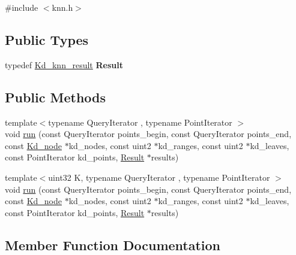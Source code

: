 {\ttfamily \#include $<$knn.\+h$>$}

\subsection*{Public Types}
\begin{DoxyCompactItemize}
\item 
\mbox{\label{structcugar_1_1cuda_1_1_kd__knn_a0786ce849457dbcd48ea5d5713134fb8}} 
typedef \hyperlink{structcugar_1_1cuda_1_1_kd__knn__result}{Kd\+\_\+knn\+\_\+result} {\bfseries Result}
\end{DoxyCompactItemize}
\subsection*{Public Methods}
\begin{DoxyCompactItemize}
\item 
{\footnotesize template$<$typename Query\+Iterator , typename Point\+Iterator $>$ }\\void \hyperlink{structcugar_1_1cuda_1_1_kd__knn_a7d04646c1a646cd30b49ba6faf4b06d2}{run} (const Query\+Iterator points\+\_\+begin, const Query\+Iterator points\+\_\+end, const \hyperlink{structcugar_1_1_kd__node}{Kd\+\_\+node} $\ast$kd\+\_\+nodes, const uint2 $\ast$kd\+\_\+ranges, const uint2 $\ast$kd\+\_\+leaves, const Point\+Iterator kd\+\_\+points, \hyperlink{structcugar_1_1cuda_1_1_kd__knn__result}{Result} $\ast$results)
\item 
{\footnotesize template$<$uint32 K, typename Query\+Iterator , typename Point\+Iterator $>$ }\\void \hyperlink{structcugar_1_1cuda_1_1_kd__knn_aa9040a5e6f8cf2ba2c5c50af64a066f8}{run} (const Query\+Iterator points\+\_\+begin, const Query\+Iterator points\+\_\+end, const \hyperlink{structcugar_1_1_kd__node}{Kd\+\_\+node} $\ast$kd\+\_\+nodes, const uint2 $\ast$kd\+\_\+ranges, const uint2 $\ast$kd\+\_\+leaves, const Point\+Iterator kd\+\_\+points, \hyperlink{structcugar_1_1cuda_1_1_kd__knn__result}{Result} $\ast$results)
\end{DoxyCompactItemize}


\subsection{Member Function Documentation}
\mbox{\label{structcugar_1_1cuda_1_1_kd__knn_a7d04646c1a646cd30b49ba6faf4b06d2}} 
